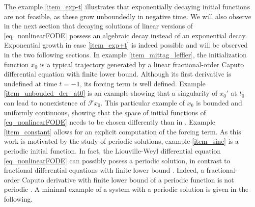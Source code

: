 \documentclass{svproc}
\begin{document}
The example \ref{item_exp-t} illustrates that exponentially decaying initial functions are not feasible, as these grow unboundedly in negative time. We will also observe in the next section that decaying solutions of linear versions of \eqref{eq_nonlinearFODE} possess an algebraic decay instead of an exponential decay. Exponential growth in case \ref{item_exp+t} is indeed possible and will be observed in the two following sections. In example \ref{item_mittag_leffler}, the initialization function $x_0$ is a typical trajectory generated by a linear fractional-order Caputo differential equation with finite lower bound. Although its first derivative is undefined at time $t=-1$, its forcing term is well defined. Example \ref{item_unbouded_der_at0} is an example showing that a singularity of $x_0'$ at $t_0$ can lead to nonexistence of $\mathcal F x_0$. This particular example of $x_0$ is bounded and uniformly continuous, showing that the space of initial functions of \eqref{eq_nonlinearFODE} needs to be chosen differently than in \cite{Hinze2020}. Example \ref{item_constant} allows for an explicit computation of the forcing term. As this work is motivated by the study of periodic solutions, example \ref{item_sine} is a periodic initial function. In fact, the Liouville-Weyl differential equation \eqref{eq_nonlinearFODE} can possibly posess a periodic solution, in contrast to fractional differential equations with finite lower bound \cite{Tavazoei2009}. Indeed, a fractional-order Caputo derivative with finite lower bound of a periodic function is not periodic \cite{Area2016}. A minimal example of a system with a periodic solution is given in the following. 
\end{document}
